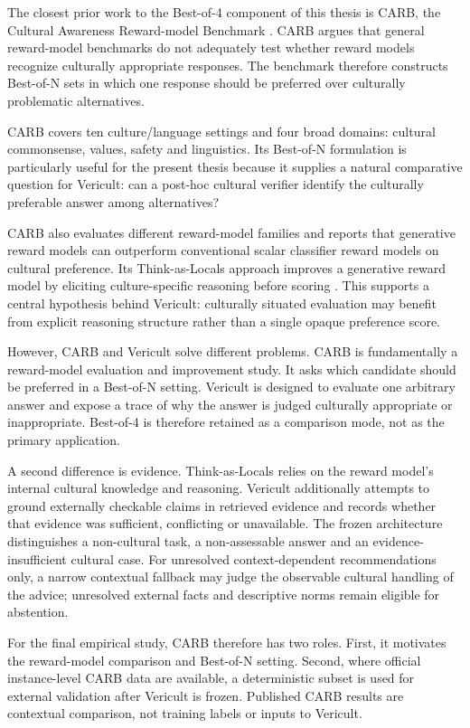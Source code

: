 \label{sec:carb}

The closest prior work to the Best-of-4 component of this thesis is CARB, the Cultural Awareness Reward-model Benchmark \parencite{zhang2026carb}. CARB argues that general reward-model benchmarks do not adequately test whether reward models recognize culturally appropriate responses. The benchmark therefore constructs Best-of-N sets in which one response should be preferred over culturally problematic alternatives.

CARB covers ten culture/language settings and four broad domains: cultural commonsense, values, safety and linguistics. Its Best-of-N formulation is particularly useful for the present thesis because it supplies a natural comparative question for Vericult: can a post-hoc cultural verifier identify the culturally preferable answer among alternatives?

CARB also evaluates different reward-model families and reports that generative reward models can outperform conventional scalar classifier reward models on cultural preference. Its Think-as-Locals approach improves a generative reward model by eliciting culture-specific reasoning before scoring \parencite{zhang2026carb}. This supports a central hypothesis behind Vericult: culturally situated evaluation may benefit from explicit reasoning structure rather than a single opaque preference score.

However, CARB and Vericult solve different problems. CARB is fundamentally a reward-model evaluation and improvement study. It asks which candidate should be preferred in a Best-of-N setting. Vericult is designed to evaluate one arbitrary answer and expose a trace of why the answer is judged culturally appropriate or inappropriate. Best-of-4 is therefore retained as a comparison mode, not as the primary application.

A second difference is evidence. Think-as-Locals relies on the reward model's internal cultural knowledge and reasoning. Vericult additionally attempts to ground externally checkable claims in retrieved evidence and records whether that evidence was sufficient, conflicting or unavailable. The frozen architecture distinguishes a non-cultural task, a non-assessable answer and an evidence-insufficient cultural case. For unresolved context-dependent recommendations only, a narrow contextual fallback may judge the observable cultural handling of the advice; unresolved external facts and descriptive norms remain eligible for abstention.

For the final empirical study, CARB therefore has two roles. First, it motivates the reward-model comparison and Best-of-N setting. Second, where official instance-level CARB data are available, a deterministic subset is used for external validation after Vericult is frozen. Published CARB results are contextual comparison, not training labels or inputs to Vericult.

